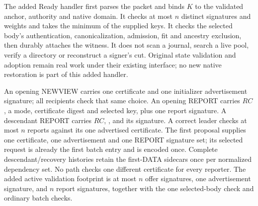The added Ready handler first parses the packet and binds $K$ to the
validated anchor, authority and native domain. It checks at most $n$
distinct signatures and weights and takes the minimum of the supplied
keys. It checks the selected body's authentication, canonicalization,
admission, fit and ancestry exclusion, then durably attaches the witness.
It does not scan a journal, search a live pool, verify a directory or
reconstruct a signer's cut. Original state validation and adoption remain
real work under their existing interface; no new native restoration is
part of this added handler.

An opening NEWVIEW carries one certificate and one initializer
advertisement signature; all recipients check that same choice.
An opening REPORT carries $\mathit{RC}$, a mode, certificate digest and
selected key, plus one report signature. A descendant REPORT carries
$\mathit{RC}$, ,  and its signature. A correct
leader checks at most $n$ reports against its one advertised certificate.
The first proposal supplies one certificate, one advertisement and one
REPORT signature set; its selected request is already the first batch
entry and is encoded once. Complete descendant/recovery histories retain
the first-DATA sidecars once per normalized dependency set. No path checks
one different certificate for every reporter. The added active validation
footprint is at most $n$ offer signatures, one advertisement signature,
and $n$ report signatures, together with the one selected-body check and
ordinary batch checks.

